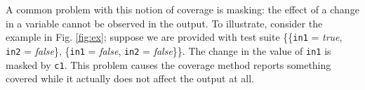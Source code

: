 A common problem with this notion of coverage is masking: 
the effect of a change in a variable cannot be observed in the output. To illustrate, consider the example in Fig. \ref{fig:ex}; suppose we are provided with
test suite \{\{{\tt in1} = \emph{true}, {\tt in2} = \emph{false}\}, 
\{{\tt in1} = \emph{false}, {\tt in2} = \emph{false}\}\}. The change in the value of 
{\tt in1} is masked by {\tt c1}. This problem causes the coverage method reports something covered 
while it actually does not affect the output at all.




